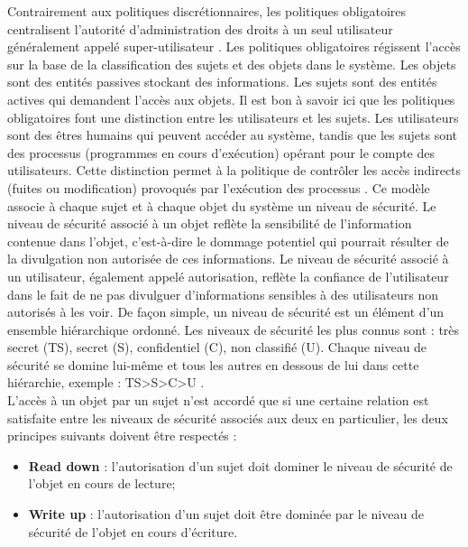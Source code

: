 Contrairement aux politiques discrétionnaires, les politiques obligatoires centralisent l'autorité d'administration des droits à un seul utilisateur généralement appelé super-utilisateur \cite{lindqvist06}. Les politiques obligatoires régissent l'accès sur la base de la classification des sujets et des objets dans le système. Les objets sont des entités passives stockant des informations. Les sujets sont des entités actives qui demandent l'accès aux objets. Il est bon à savoir ici que les politiques obligatoires font une distinction entre les utilisateurs et les sujets. Les utilisateurs sont des êtres humains qui peuvent accéder au système, tandis que les sujets sont des processus (programmes en cours d'exécution) opérant pour le compte des utilisateurs. Cette distinction permet à la politique de contrôler les accès indirects (fuites ou modification) provoqués par l'exécution des processus \cite{samarati00}. Ce modèle associe à chaque sujet et à chaque objet du système un niveau de sécurité. Le niveau de sécurité associé à un objet reflète la sensibilité de l'information contenue dans l'objet, c'est-à-dire le dommage potentiel qui pourrait résulter de la divulgation non autorisée de ces informations. Le niveau de sécurité associé à un utilisateur, également appelé autorisation, reflète la confiance de l'utilisateur dans le fait de ne pas divulguer d'informations sensibles à des utilisateurs non autorisés à les voir. De façon simple, un niveau de sécurité est un élément d'un ensemble hiérarchique ordonné. Les niveaux de sécurité les plus connus sont : très secret (TS), secret (S), confidentiel (C), non classifié (U). Chaque niveau de sécurité se domine lui-même et tous les autres en dessous de lui dans cette hiérarchie, exemple : TS>S>C>U \cite{sandhu94}. \\
\hspace*{0.5cm} L'accès à un objet par un sujet n'est accordé que si une certaine relation est satisfaite entre les niveaux de sécurité associés aux deux en particulier, les deux principes suivants doivent être respectés \cite{sandhu94} :
\begin{itemize}
\item \textbf{Read down} : l'autorisation d'un sujet doit dominer le niveau de sécurité de l'objet en cours de lecture;
\item \textbf{Write up} : l'autorisation d'un sujet doit être dominée par le niveau de sécurité de l'objet en cours d'écriture.
\end{itemize}
